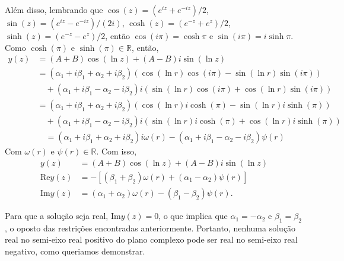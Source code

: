 \documentclass[a4paper,12pt, leqno, answers]{exam}
\begin{document}
\begin{questions}
\begin{solution}
        Al\'{e}m disso, lembrando que $\cos\left(z\right) = (e^{iz}+e^{-iz})/2$, $\sin\left(z\right) = (e^{iz}-e^{-iz})/(2i)$, $\cosh\left(z\right) = (e^{-z}+e^{z})/2$, $\sinh\left(z\right) = (e^{-z}-e^{z})/2$, ent\~{a}o $\cos\left(i \pi\right) = \cosh \pi$ e $\sin\left(i \pi\right) = i\sinh \pi$. Como $\cosh\left(\pi\right)$ e $\sinh\left(\pi\right) \in \mathbb{R}$, ent\~{a}o,  
        \begin{align*}
            y(z) &= \left( A + B \right) \cos\left( \ln z \right) + \left( A - B \right) i \sin \left( \ln z \right) \\
            &= \left( \alpha_1 + i \beta_1 + \alpha_2 + i\beta_2 \right)\left( \cos\left(\ln r\right) \cos\left(i \pi\right) - \sin\left(\ln r\right) \sin\left(i \pi\right)\right) \\
            &\quad {}+ \left( \alpha_1 + i \beta_1 - \alpha_2 - i\beta_2 \right) i\left( \sin\left(\ln r\right) \cos\left(i \pi\right) + \cos\left(\ln r\right) \sin\left(i \pi \right)\right) \\
            &= \left( \alpha_1 + i \beta_1 + \alpha_2 + i\beta_2 \right)\left( \cos\left(\ln r\right) i\cosh\left(\pi\right) - \sin\left(\ln r\right) i\sinh\left(\pi\right)\right) \\
            &\quad {}+ \left( \alpha_1 + i \beta_1 - \alpha_2 - i\beta_2 \right) i\left( \sin\left(\ln r\right) i\cosh\left(\pi\right) + \cos\left(\ln r\right) i\sinh\left(\pi \right)\right) \\
            &\quad {}= \left( \alpha_1 + i \beta_1 + \alpha_2 + i\beta_2 \right)i \omega\left(r \right) - \left( \alpha_1 + i \beta_1 - \alpha_2 - i\beta_2 \right)  \psi\left(r \right)
        \end{align*}        
         Com $\omega\left(r\right) \text{ e } \psi\left(r\right) \in \mathbb{R}$. Com isso,
        \begin{align*}
             y\left( z \right) &= \left( A + B \right) \cos\left( \ln z \right) + \left( A - B \right) i \sin\left( \ln z \right) \\
             \mathrm{Re}y\left( z \right) &= -\left[\left(\beta_1 + \beta_2 \right)\omega \left(r\right) + \left(\alpha_1 - \alpha_2\right)\psi \left(r\right)\right]\\
             \mathrm{Im}y\left( z \right) &= \left(\alpha_1 + \alpha_2\right)\omega \left(r\right) - \left(\beta_1 - \beta_2\right)\psi \left(r\right).
        \end{align*}
         
        Para que a solu\c c\~{a}o seja real, $\mathrm{Im} y\left(z\right) = 0$, o que implica que $\alpha_1 = - \alpha_2$ e $\beta_1 = \beta_2$, o oposto das restrições encontradas anteriormente. Portanto, nenhuma solu\c c\~{a}o real no semi-eixo real positivo do plano complexo pode ser real no semi-eixo real negativo, como queriamos demonstrar.
    \end{solution}


\end{questions}
\end{document}
